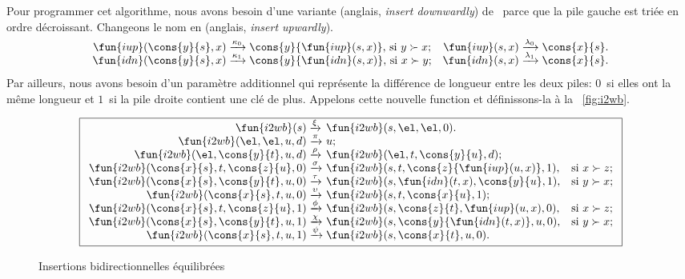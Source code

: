 Pour programmer cet algorithme, nous avons besoin d'une variante
 (anglais, \emph{insert downwardly})
de~ parce que la pile gauche est
triée en ordre décroissant. Changeons le nom  en
 (anglais, \emph{insert upwardly}).
\begin{equation*}
\begin{array}{@{}r@{\;}l@{\;}lr@{\;}l@{\;}l@{}}
  \fun{iup}(\cons{y}{s},x)
& \xrightarrow{\smash{\kappa_0}}
& \cons{y}{\fun{iup}(s,x)},\,\text{si \(y \succ x\)};
& \fun{iup}(s,x)
& \xrightarrow{\smash{\lambda_0}} & \cons{x}{s}.\\
  \fun{idn}(\cons{y}{s},x)
& \xrightarrow{\smash{\kappa_1}}
& \cons{y}{\fun{idn}(s,x)},\,\text{si \(x \succ y\)};
& \fun{idn}(s,x)
& \xrightarrow{\smash{\lambda_1}} & \cons{x}{s}.
\end{array}
\end{equation*}
Par ailleurs, nous avons besoin d'un paramètre additionnel qui
représente la différence de longueur entre les deux piles: \(0\)~si
elles ont la même longueur et \(1\)~si la pile droite contient une clé
de plus. Appelons cette nouvelle function
 et
définissons-la à la \fig~\vref{fig:i2wb}.
\begin{figure}[t]
\begin{equation*}
\boxed{%
\begin{array}{r@{\;}l@{\;}ll}
\fun{i2wb}(s)
& \xrightarrow{\smash{\xi}} & \fun{i2wb}(s,\el,\el,0).\\
\fun{i2wb}(\el,\el,u,d)
& \xrightarrow{\smash{\pi}} & u;\\
\fun{i2wb}(\el,\cons{y}{t},u,d)
& \xrightarrow{\smash{\rho}} & \fun{i2wb}(\el,t,\cons{y}{u},d);\\
\fun{i2wb}(\cons{x}{s},t,\cons{z}{u},0)
& \xrightarrow{\smash{\sigma}} &
\fun{i2wb}(s,t,\cons{z}{\fun{iup}(u,x)},1),
& \text{si \(x \succ z\)};\\
\fun{i2wb}(\cons{x}{s},\cons{y}{t},u,0)
& \xrightarrow{\smash{\tau}} &
\fun{i2wb}(s,\fun{idn}(t,x),\cons{y}{u},1),
& \text{si \(y \succ x\)};\\
\fun{i2wb}(\cons{x}{s},t,u,0)
& \xrightarrow{\smash{\upsilon}} & \fun{i2wb}(s,t,\cons{x}{u},1);\\
\fun{i2wb}(\cons{x}{s},t,\cons{z}{u},1)
& \xrightarrow{\smash{\phi}}
& \fun{i2wb}(s,\cons{z}{t},\fun{iup}(u,x),0),
& \text{si \(x \succ z\)};\\
\fun{i2wb}(\cons{x}{s},\cons{y}{t},u,1)
& \xrightarrow{\smash{\chi}}
& \fun{i2wb}(s,\cons{y}{\fun{idn}(t,x)},u,0),
& \text{si \(y \succ x\)};\\
\fun{i2wb}(\cons{x}{s},t,u,1) & \xrightarrow{\smash{\psi}} &
\fun{i2wb}(s,\cons{x}{t},u,0).
\end{array}}
\end{equation*}
\caption{Insertions bidirectionnelles équilibrées \label{fig:i2wb}}
\end{figure}

